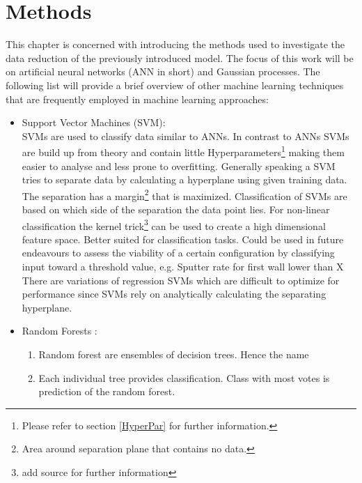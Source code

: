 \chapter{Methods}
	This chapter is concerned with introducing the methods used to investigate the data reduction of the previously introduced model. The focus of this work will be on artificial neural networks (ANN in short) and Gaussian processes.
	The following list will provide a brief overview of other machine learning techniques that are frequently employed in machine learning approaches:
	\begin{itemize}
		\item Support Vector Machines (SVM):\\
			SVMs are used to classify data similar to ANNs. In contrast to ANNs SVMs are build up from theory and contain little Hyperparameters\footnote{Please refer to section \ref{HyperPar} for further information.} making them easier to analyse and less prone to overfitting. Generally speaking a SVM tries to separate data by calculating a hyperplane using given training data. The separation has a margin\footnote{Area around separation plane that contains no data.} that is maximized. Classification of SVMs are based on which side of the separation the data point lies. For non-linear classification the kernel trick\footnote{add source for further information} can be used to create a high dimensional feature space.
			Better suited for classification tasks. Could be used in future endeavours to assess the viability of a certain configuration by classifying input toward a threshold value, e.g. Sputter rate for first wall lower than X \\
			There are variations of regression SVMs which are difficult to optimize for performance since SVMs rely on analytically calculating the separating hyperplane.\\
		\item Random Forests :\\
			\begin{enumerate}
				\item Random forest are ensembles of decision trees. Hence the name \\
				\item Each individual tree provides classification. Class with most votes is prediction of the random forest.\\

\end{enumerate}
\end{itemize}
